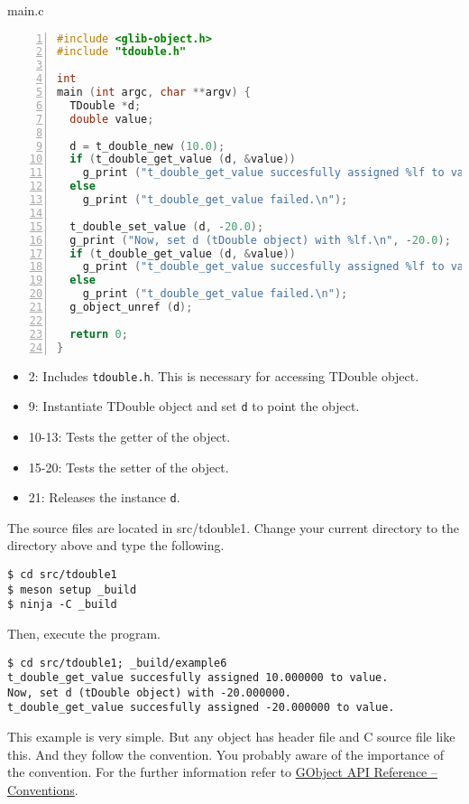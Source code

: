main.c

\begin{lstlisting}[language=C, numbers=left]
#include <glib-object.h>
#include "tdouble.h"

int
main (int argc, char **argv) {
  TDouble *d;
  double value;

  d = t_double_new (10.0);
  if (t_double_get_value (d, &value))
    g_print ("t_double_get_value succesfully assigned %lf to value.\n", value);
  else
    g_print ("t_double_get_value failed.\n");

  t_double_set_value (d, -20.0);
  g_print ("Now, set d (tDouble object) with %lf.\n", -20.0);
  if (t_double_get_value (d, &value))
    g_print ("t_double_get_value succesfully assigned %lf to value.\n", value);
  else
    g_print ("t_double_get_value failed.\n");
  g_object_unref (d);

  return 0;
}
\end{lstlisting}

\begin{itemize}
\tightlist
\item
  2: Includes \passthrough{\lstinline!tdouble.h!}. This is necessary for
  accessing TDouble object.
\item
  9: Instantiate TDouble object and set \passthrough{\lstinline!d!} to
  point the object.
\item
  10-13: Tests the getter of the object.
\item
  15-20: Tests the setter of the object.
\item
  21: Releases the instance \passthrough{\lstinline!d!}.
\end{itemize}

The source files are located in src/tdouble1. Change your current
directory to the directory above and type the following.

\begin{lstlisting}
$ cd src/tdouble1
$ meson setup _build
$ ninja -C _build
\end{lstlisting}

Then, execute the program.

\begin{lstlisting}
$ cd src/tdouble1; _build/example6
t_double_get_value succesfully assigned 10.000000 to value.
Now, set d (tDouble object) with -20.000000.
t_double_get_value succesfully assigned -20.000000 to value.
\end{lstlisting}

This example is very simple. But any object has header file and C source
file like this. And they follow the convention. You probably aware of
the importance of the convention. For the further information refer to
\href{https://docs.gtk.org/gobject/concepts.html\#conventions}{GObject
API Reference -- Conventions}.

